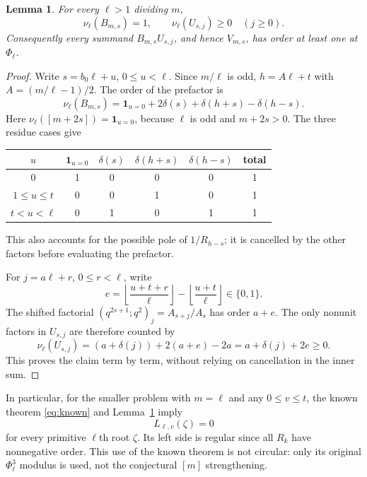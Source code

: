 \documentclass[11pt,a4paper]{article}
\newtheorem{lemma}[theorem]{Lemma}
\begin{document}
\begin{lemma}\label{lem:right}
For every $\ell>1$ dividing $m$,
\[
 \nu_\ell(B_{m,s})=1,\qquad \nu_\ell(U_{s,j})\geq0\quad(j\geq0).
\]
Consequently every summand $B_{m,s}U_{s,j}$, and hence $V_{m,s}$, has
order at least one at $\Phi_\ell$.
\end{lemma}
\begin{proof}
Write $s=b_0\ell+u$, $0\leq u<\ell$. Since $m/\ell$ is odd,
$h=A\ell+t$ with $A=(m/\ell-1)/2$. The order of the prefactor is
\[
 \nu_\ell(B_{m,s})=
 \mathbf1_{u=0}+2\delta(s)+\delta(h+s)-\delta(h-s).
\]
Here $\nu_\ell([m+2s])=\mathbf1_{u=0}$, because $\ell$ is odd and
$m+2s>0$. The three residue cases give
\begin{center}
\begin{tabular}{c|cccc|c}
$u$ & $\mathbf1_{u=0}$ & $\delta(s)$ & $\delta(h+s)$ & $\delta(h-s)$ & total\\\hline
$0$ &1&0&0&0&1\\
$1\leq u\leq t$ &0&0&1&0&1\\
$t<u<\ell$ &0&1&0&1&1
\end{tabular}
\end{center}
This also accounts for the possible pole of $1/R_{h-s}$; it is cancelled
by the other factors before evaluating the prefactor.

For $j=a\ell+r$, $0\leq r<\ell$, write
\[
 e=\left\lfloor\frac{u+t+r}{\ell}\right\rfloor
 -\left\lfloor\frac{u+t}{\ell}\right\rfloor\in\{0,1\}.
\]
The shifted factorial $(q^{2s+1};q^2)_j=A_{s+j}/A_s$ has order $a+e$.
The only nonunit factors in $U_{s,j}$ are therefore counted by
\begin{equation}\label{eq:Uorder}
 \nu_\ell(U_{s,j})=(a+\delta(j))+2(a+e)-2a
 =a+\delta(j)+2e\geq0.
\end{equation}
This proves the claim term by term, without relying on cancellation in
the inner sum.
\end{proof}

In particular, for the smaller problem with $m=\ell$ and any
$0\leq v\leq t$, the known theorem \eqref{eq:known} and
Lemma~\ref{lem:right} imply
\begin{equation}\label{eq:smallzero}
 L_{\ell,v}(\zeta)=0
\end{equation}
for every primitive $\ell$th root $\zeta$.
Its left side is regular since all $R_k$ have nonnegative order.
This use of the known theorem is not circular: only its original
$\Phi_\ell^3$ modulus is used, not the conjectural $[m]$ strengthening.
\end{document}

